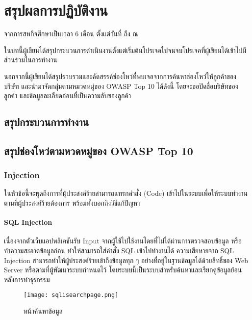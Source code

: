 \chapter{สรุปผลการปฏิบัติงาน}
\label{chapter:experiment}

จากการสหกิจศึกษาเป็นเวลา 6 เดือน ตั้งแต่วันที่ \StartDWork ถึง \EndDWork ณ \Company

ในบทนี้ผู้เขียนได้สรุปกระบวนการดำเนินงานตั้งแต่เริ่มต้นโปรเจคไปจนจบโปรเจคที่ผู้เขียนได้เข้าไปมีส่วนร่วมในการทำงาน

นอกจากนี้ผู้เขียนได้สรุปรวบรวมและคัดสรรค์ช่องโหว่ที่พบเจอจากการค้นหาช่องโหว่ให้ลูกค้าของบริษัท และนำมาจัดกลุ่มตามหมวดหมู่ของ OWASP Top 10 ได้ดังนี้ โดยจะขอปิดชื่อบริษัทของลูกค้า และข้อมูลละเอียดอ่อนที่เป็นความลับของลูกค้า

\section{สรุปกระบวนการทำงาน}

\section{สรุปช่องโหว่ตามหวดหมู่ของ OWASP Top 10}

\subsection{Injection}

ในหัวข้อนี้จะพูดถึงการที่ผู้ประสงค์ร้ายสามารถแทรกคำสั่ง (Code) เข้าไปในระบบเพื่อให้ระบบทำงานตามที่ผู้ประสงค์ร้ายต้องการ พร้อมทั้งบอกถึงวิธีแก้ปัญหา

\subsubsection{SQL Injection}

เนื่องจากตัวเว็บแอปพลิเคชันรับ Input จากผู้ใช้ไปใช้งานโดยที่ไม่ได้ผ่านการตรวจสอบข้อมูล หรือทำความสะอาดข้อมูลก่อน ทำให้สามารถใส่คำสั่ง SQL เข้าไปทำงานได้ ความเสียหายจาก SQL Injection สามารถทำให้ผู้ประสงค์ร้ายเข้าถึงข้อมูลทุก ๆ อย่างที่อยู่ในฐานข้อมูลได้ด้วยสิทธิ์ของ Web Server หรือตามที่ผู้พัฒนาระบบกำหนดไว้ โดยระบบนี้เป็นระบบสำหรับค้นหาและเรียกดูข้อมูลย้อนหลังการทำธุรกรรม

\begin{figure}[h]
	\centering
	\texttt{[image: sqlisearchpage.png]}
	\caption{หน้าค้นหาข้อมูล}
	\label{Fig:sqlisearchpage.png}
\end{figure}

